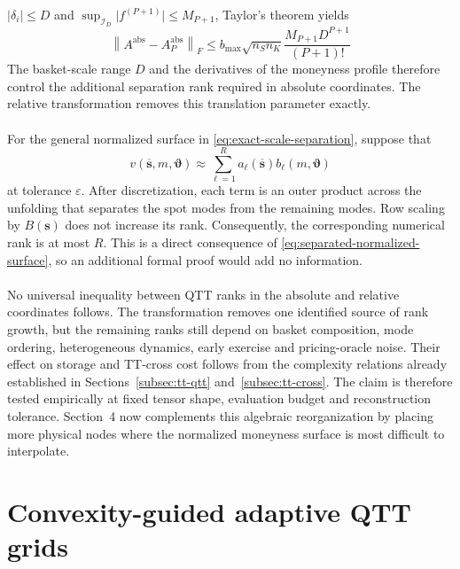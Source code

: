 \documentclass{article}
\numberwithin{equation}{subsection}
\theoremstyle{definition}
\theoremstyle{remark}
\begin{document}
\(\lvert\delta_i\rvert\leq D\) and
\(\sup_{\mathcal{I}_D}\lvert f^{(P+1)}\rvert\leq M_{P+1}\), Taylor's theorem
yields
\begin{equation}
\left\|
A^{\mathrm{abs}}
-
A_P^{\mathrm{abs}}
\right\|_F
\leq
b_{\max}\sqrt{n_Sn_K}
\frac{
M_{P+1}D^{P+1}
}{
(P+1)!
}
\label{eq:absolute-rank-bound}
\end{equation}
The basket-scale range \(D\) and the derivatives of the moneyness profile
therefore control the additional separation rank required in absolute
coordinates. The relative transformation removes this translation parameter
exactly.\\
\\
For the general normalized surface in
\eqref{eq:exact-scale-separation}, suppose that
\begin{equation}
v
\left(
\overline{\boldsymbol{s}},m,\boldsymbol{\vartheta}
\right)
\approx
\sum_{\ell=1}^{R}
a_\ell
\left(
\overline{\boldsymbol{s}}
\right)
b_\ell
\left(
m,\boldsymbol{\vartheta}
\right)
\label{eq:separated-normalized-surface}
\end{equation}
at tolerance \(\varepsilon\). After discretization, each term is an outer
product across the unfolding that separates the spot modes from the remaining
modes. Row scaling by \(B(\boldsymbol{s})\) does not increase its rank.
Consequently, the corresponding numerical rank is at most \(R\). This is a
direct consequence of \eqref{eq:separated-normalized-surface}, so an additional
formal proof would add no information.\\
\\
No universal inequality between QTT ranks in the absolute and relative
coordinates follows. The transformation removes one
identified source of rank growth, but the remaining ranks still depend on
basket composition, mode ordering, heterogeneous dynamics, early exercise and
pricing-oracle noise. Their effect on storage and TT-cross cost follows from
the complexity relations already established in
Sections~\ref{subsec:tt-qtt} and~\ref{subsec:tt-cross}. The claim is therefore
tested empirically at fixed tensor shape, evaluation budget and reconstruction
tolerance. Section~4 now complements this algebraic reorganization by placing
more physical nodes where the normalized moneyness surface is most difficult
to interpolate.

\section{Convexity-guided adaptive QTT grids}
\end{document}
